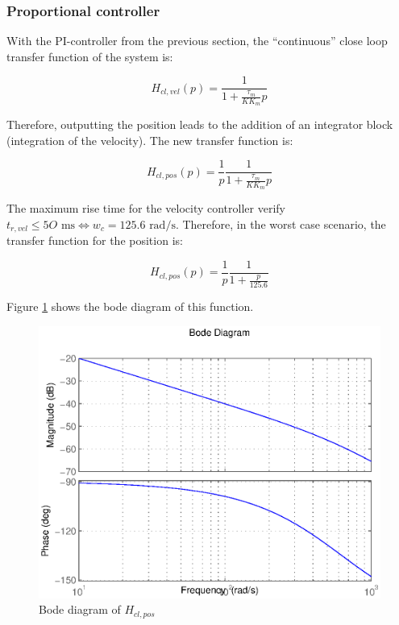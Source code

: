 
\subsubsection*{Proportional controller}

With the PI-controller from the previous section, the ``continuous'' close loop transfer function of the system is:

\begin{equation}
 H_{cl,vel}(p) = \frac{1}{1 + \frac{\tau_m}{K K_m}p}
\end{equation}

Therefore, outputting the position leads to the addition of an integrator block (integration of the velocity). The new transfer function is:

\begin{equation}
 H_{cl,pos}(p) = \frac{1}{p}\frac{1}{1 + \frac{\tau_m}{K K_m}p}
\end{equation}

The maximum rise time for the velocity controller verify $t_{r,vel} \leq 5O \text{ ms} \Leftrightarrow w_c = 125.6 \text{ rad/s}$. Therefore, in the worst case scenario, the transfer function for the position is:

\begin{equation}
 H_{cl,pos}(p) = \frac{1}{p} \frac{1}{1 + \frac{p}{125.6}}
\end{equation}

Figure \ref{bodePos} shows the bode diagram of this function.

\begin{center}
\begin{figure}[ht]
 \includegraphics[width=\linewidth]{fig/bodePos.eps}
 \caption{Bode diagram of $H_{cl,pos}$}
 \label{bodePos}
\end{figure}
\end{center}

